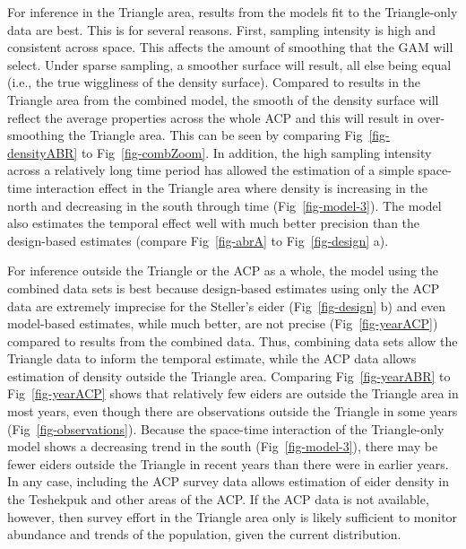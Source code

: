 \documentclass[
  10pt,
  letterpaper,
]{article}
\begin{document}
For inference in the Triangle area, results from the models fit to the
Triangle-only data are best. This is for several reasons. First,
sampling intensity is high and consistent across space. This affects the
amount of smoothing that the GAM will select. Under sparse sampling, a
smoother surface will result, all else being equal (i.e., the true
wiggliness of the density surface). Compared to results in the Triangle
area from the combined model, the smooth of the density surface will
reflect the average properties across the whole ACP and this will result
in over-smoothing the Triangle area. This can be seen by comparing
Fig~\ref{fig-densityABR} to Fig~\ref{fig-combZoom}. In addition, the
high sampling intensity across a relatively long time period has allowed
the estimation of a simple space-time interaction effect in the Triangle
area where density is increasing in the north and decreasing in the
south through time (Fig~\ref{fig-model-3}). The model also estimates the
temporal effect well with much better precision than the design-based
estimates (compare Fig~\ref{fig-abrA} to Fig~\ref{fig-design} a).

For inference outside the Triangle or the ACP as a whole, the model
using the combined data sets is best because design-based estimates
using only the ACP data are extremely imprecise for the Steller's eider
(Fig~\ref{fig-design} b) and even model-based estimates, while much
better, are not precise (Fig~\ref{fig-yearACP}) compared to results from
the combined data. Thus, combining data sets allow the Triangle data to
inform the temporal estimate, while the ACP data allows estimation of
density outside the Triangle area. Comparing Fig~\ref{fig-yearABR} to
Fig~\ref{fig-yearACP} shows that relatively few eiders are outside the
Triangle area in most years, even though there are observations outside
the Triangle in some years (Fig~\ref{fig-observations}). Because the
space-time interaction of the Triangle-only model shows a decreasing
trend in the south (Fig~\ref{fig-model-3}), there may be fewer eiders
outside the Triangle in recent years than there were in earlier years.
In any case, including the ACP survey data allows estimation of eider
density in the Teshekpuk and other areas of the ACP. If the ACP data is
not available, however, then survey effort in the Triangle area only is
likely sufficient to monitor abundance and trends of the population,
given the current distribution.
\end{document}
